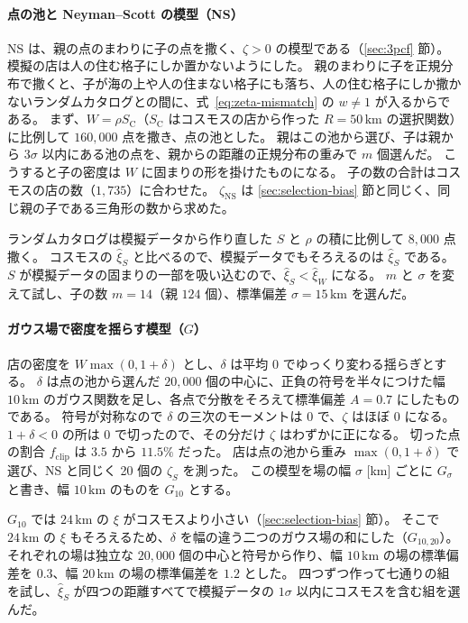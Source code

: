 \documentclass[a4paper,11pt]{ltjsarticle}
\begin{document}
\paragraph{点の池と Neyman--Scott の模型（NS）}
NS は、親の点のまわりに子の点を撒く、$\zeta > 0$ の模型である（\ref{sec:3pcf} 節）。
模擬の店は人の住む格子にしか置かないようにした。
親のまわりに子を正規分布で撒くと、子が海の上や人の住まない格子にも落ち、人の住む格子にしか撒かないランダムカタログとの間に、式~\eqref{eq:zeta-mismatch} の $w \ne 1$ が入るからである。
まず、$W = \rho S_{\mathrm{C}}$（$S_{\mathrm{C}}$ はコスモスの店から作った $R = 50\,\mathrm{km}$ の選択関数）に比例して $160{,}000$ 点を撒き、点の池とした。
親はこの池から選び、子は親から $3\sigma$ 以内にある池の点を、親からの距離の正規分布の重みで $m$ 個選んだ。
こうすると子の密度は $W$ に固まりの形を掛けたものになる。
子の数の合計はコスモスの店の数（$1{,}735$）に合わせた。
$\zeta_{\mathrm{NS}}$ は \ref{sec:selection-bias} 節と同じく、同じ親の子である三角形の数から求めた。

ランダムカタログは模擬データから作り直した $S$ と $\rho$ の積に比例して $8{,}000$ 点撒く。
コスモスの $\hat\xi_S$ と比べるので、模擬データでもそろえるのは $\hat\xi_S$ である。
$S$ が模擬データの固まりの一部を吸い込むので、$\hat\xi_S < \hat\xi_W$ になる。
$m$ と $\sigma$ を変えて試し、子の数 $m = 14$（親 $124$ 個）、標準偏差 $\sigma = 15\,\mathrm{km}$ を選んだ。

\paragraph{ガウス場で密度を揺らす模型（$G$）}
店の密度を $W \max(0, 1 + \delta)$ とし、$\delta$ は平均 $0$ でゆっくり変わる揺らぎとする。
$\delta$ は点の池から選んだ $20{,}000$ 個の中心に、正負の符号を半々につけた幅 $10\,\mathrm{km}$ のガウス関数を足し、各点で分散をそろえて標準偏差 $A = 0.7$ にしたものである。
符号が対称なので $\delta$ の三次のモーメントは $0$ で、$\zeta$ はほぼ $0$ になる。
$1 + \delta < 0$ の所は $0$ で切ったので、その分だけ $\zeta$ はわずかに正になる。
切った点の割合 $f_{\mathrm{clip}}$ は $3.5$ から $11.5\%$ だった。
店は点の池から重み $\max(0, 1 + \delta)$ で選び、NS と同じく 20 個の $\hat\zeta_S$ を測った。
この模型を場の幅 $\sigma$ [km] ごとに $G_\sigma$ と書き、幅 $10\,\mathrm{km}$ のものを $G_{10}$ とする。

$G_{10}$ では $24\,\mathrm{km}$ の $\xi$ がコスモスより小さい（\ref{sec:selection-bias} 節）。
そこで $24\,\mathrm{km}$ の $\xi$ もそろえるため、$\delta$ を幅の違う二つのガウス場の和にした（$G_{10,20}$）。
それぞれの場は独立な $20{,}000$ 個の中心と符号から作り、幅 $10\,\mathrm{km}$ の場の標準偏差を $0.3$、幅 $20\,\mathrm{km}$ の場の標準偏差を $1.2$ とした。
四つずつ作って七通りの組を試し、$\hat\xi_S$ が四つの距離すべてで模擬データの $1\sigma$ 以内にコスモスを含む組を選んだ。
\end{document}
